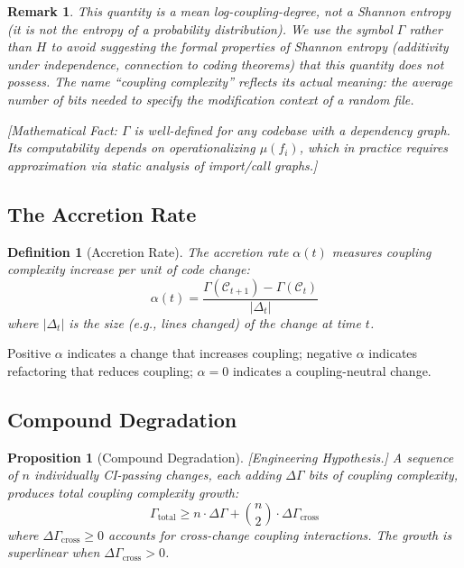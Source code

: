 \documentclass[11pt, a4paper, copyright]{googledeepmind}
\newtheorem{definition}{Definition}[section]
\newtheorem{proposition}{Proposition}[section]
\newtheorem*{remark}{Remark}
\begin{document}
\begin{remark}
This quantity is a mean log-coupling-degree, not a Shannon entropy (it is not the entropy of a probability distribution). We use the symbol $\Gamma$ rather than $H$ to avoid suggesting the formal properties of Shannon entropy (additivity under independence, connection to coding theorems) that this quantity does not possess. The name ``coupling complexity'' reflects its actual meaning: the average number of bits needed to specify the modification context of a random file.
\end{remark}

\emph{[Mathematical Fact: $\Gamma$ is well-defined for any codebase with a dependency graph. Its computability depends on operationalizing $\mu(f_i)$, which in practice requires approximation via static analysis of import/call graphs.]}

\subsection{The Accretion Rate}

\begin{definition}[Accretion Rate]
\label{def:accretion-rate}
The \emph{accretion rate} $\alpha(t)$ measures coupling complexity increase per unit of code change:
\begin{equation}
\alpha(t) = \frac{\Gamma(\mathcal{C}_{t+1}) - \Gamma(\mathcal{C}_t)}{|\Delta_t|}
\end{equation}
where $|\Delta_t|$ is the size (e.g., lines changed) of the change at time $t$.
\end{definition}

Positive $\alpha$ indicates a change that increases coupling; negative $\alpha$ indicates refactoring that reduces coupling; $\alpha = 0$ indicates a coupling-neutral change.

\subsection{Compound Degradation}

\begin{proposition}[Compound Degradation]
\label{thm:compound-degradation}
\emph{[Engineering Hypothesis.]} A sequence of $n$ individually CI-passing changes, each adding $\Delta \Gamma$ bits of coupling complexity, produces total coupling complexity growth:
\begin{equation}
    \Gamma_{\text{total}} \geq n \cdot \Delta \Gamma + \binom{n}{2} \cdot \Delta \Gamma_{\text{cross}}
\end{equation}
where $\Delta \Gamma_{\text{cross}} \geq 0$ accounts for cross-change coupling interactions. The growth is superlinear when $\Delta \Gamma_{\text{cross}} > 0$.
\end{proposition}
\end{document}

